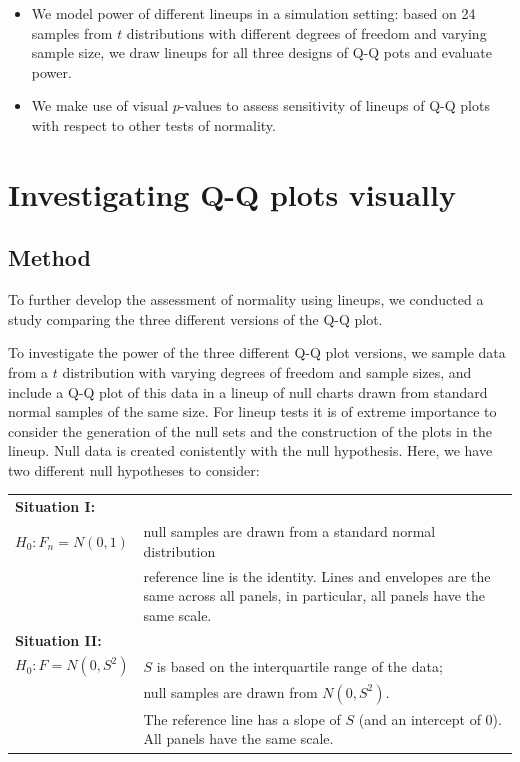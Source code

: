 \documentclass{article}\usepackage[]{graphicx}\usepackage[]{color}
\newcommand{\hh}[1]{{\color{magenta} #1}}
\newcommand{\al}[1]{{\color{red} #1}}
\newcommand{\hhnote}[1]{\todo[inline,color=magenta!40]{#1}}
\begin{document}
\hhnote{Outline of the paper:}
\hh{
\begin{itemize}
\item We model power of different lineups in a simulation setting: based on 24 samples from $t$ distributions with different degrees of freedom and varying sample size, we draw lineups for all three designs of Q-Q pots and evaluate power.
\item We make use of visual $p$-values to assess sensitivity of lineups of Q-Q plots with respect to other tests of normality.
\end{itemize}}


\section{Investigating Q-Q plots visually}\label{sec:qqplot}

\subsection{Method}

To further \al{develop} the assessment of normality using lineups, we conducted a study comparing the three different versions of the Q-Q plot.


To investigate the power of the three different Q-Q plot versions, we sample data from a $t$ distribution with varying degrees of freedom and sample sizes, and include a Q-Q plot of this data in a lineup of null charts drawn from standard normal samples of the same size.
For lineup tests it is of extreme importance to consider the generation of the null sets and the construction of the plots in the lineup. 
Null data is created conistently with the null hypothesis. Here, we have two different null hypotheses to consider:

\begin{tabular}{lp{4.75in}}
\multicolumn{2}{l}{\bf Situation I:}\\
$H_0: F_n = N(0,1)$ &  null samples are drawn from a standard normal distribution \\
& reference line is the identity. Lines and envelopes are the same across all panels, in particular, all panels have the same scale. \\[3pt]
\multicolumn{2}{l}{\bf Situation II:}\\
$H_0: F = N(0,S^2)$ & $S$ is based on the interquartile range of the data; \\
& null samples are drawn from $N(0, S^2)$. \\
& The reference line has a slope of $S$ (and an intercept of 0).  All panels have the same scale. 
\end{tabular}
\end{document}
